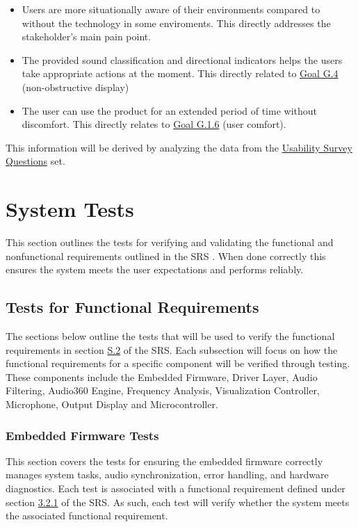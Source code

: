\documentclass[12pt, titlepage]{article}
\begin{document}
\begin{itemize}
  \item Users are more situationally aware of their environments compared to
  without the technology in some enviroments. This directly addresses the
  stakeholder's main pain point.
  \item The provided sound classification and directional indicators helps the
  users take appropriate actions at the moment. This directly related to
  \hyperref[SRS-goal:visual_display]{Goal G.4} (non-obstructive display)
  \item The user can use the product for an extended period of time without
  discomfort. This directly relates to
  \hyperref[SRS-goal:user_comfort]{Goal G.1.6} (user comfort).
\end{itemize}


This information will be derived by analyzing the data from the 
\hyperref[sec:usability_survery_questions]{Usability Survey Questions} set.


\section{System Tests} \label{sec:system_tests}

This section outlines the tests for verifying and validating the functional and
nonfunctional requirements outlined in the SRS \cite{SRS}. When done correctly
this ensures the system meets the user expectations and performs reliably. 

\subsection{Tests for Functional Requirements}

The sections below outline the tests that will be used to verify the functional
requirements in section \hyperref[SRS-sec:S.2]{S.2} of the SRS. Each subsection
will focus on how the functional requirements for a specific component will be
verified through testing. These components include the Embedded Firmware, Driver
Layer, Audio Filtering, Audio360 Engine, Frequency Analysis, Visualization
Controller, Microphone, Output Display and Microcontroller. 

\subsubsection{Embedded Firmware Tests}

This section covers the tests for ensuring the embedded firmware correctly
manages system tasks, audio synchronization, error handling, and hardware
diagnostics. Each test is associated with a functional requirement defined under
section \hyperref[SRS-sec:FR1]{3.2.1} of the SRS. As such, each test will verify
whether the system meets the associated functional requirement.
\end{document}
